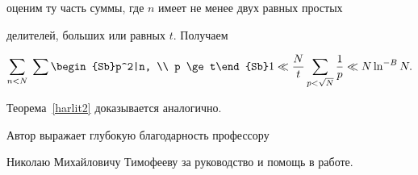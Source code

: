 оценим ту часть суммы, где $n$ имеет не менее двух равных простых


делителей, больших или равных $t$. Получаем


$$


\sum_{n<N}\; \sum\begin{Sb}p^2|n, \\ p \ge t\end{Sb} 1


\ll \frac{N}{t} \sum_{p< \sqrt N} \frac1{p}


\ll N \ln^{-B} N.


$$





Теорема~\ref{harlit2} доказывается аналогично.





Автор выражает глубокую благодарность профессору


Николаю Михайловичу Тимофееву за руководство и помощь в работе.





